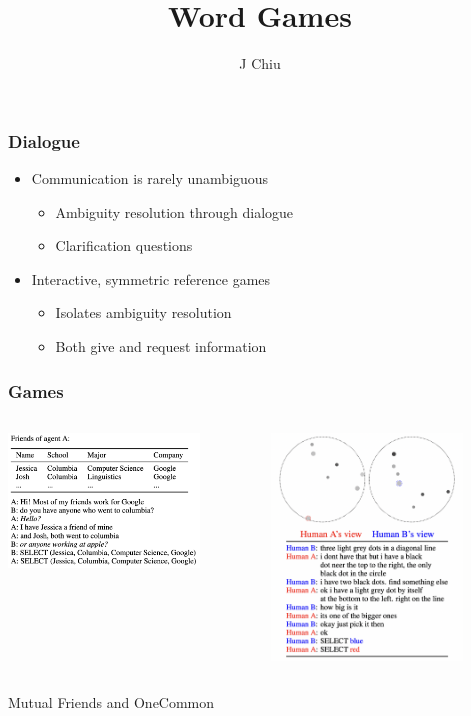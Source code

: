 \documentclass{beamer}
\title{Word Games}
\author{J Chiu}
\begin{document}
\begin{frame}[plain]
\titlepage
\end{frame}

\begin{frame}
\frametitle{Dialogue}
\begin{itemize}
\item Communication is rarely unambiguous
    \begin{itemize}
    \item Ambiguity resolution through dialogue
    \item Clarification questions
    \end{itemize}
\item Interactive, symmetric reference games
    \begin{itemize}
    \item Isolates ambiguity resolution
    \item Both give and request information
    \end{itemize}
\end{itemize}
\end{frame}

\begin{frame}
\frametitle{Games}

\begin{columns}
\begin{column}{0.5\textwidth}
\centering
\includegraphics[width=2in]{img/mf.png}
\end{column}
\begin{column}{0.5\textwidth}
\centering
\includegraphics[width=2in]{img/oc.png}
\end{column}
\end{columns}

\vspace{2em}
\centering
Mutual Friends and OneCommon
\end{frame}
\end{document}
